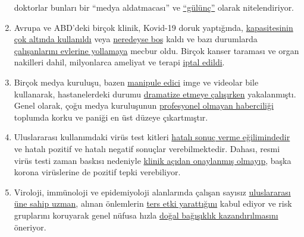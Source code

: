 \begin{enumerate}
  doktorlar bunları bir ``medya aldatmacası'' ve
  \href{https://www.aerztezeitung.de/Politik/Montgomery-haelt-Maskenpflicht-fuer-falsch-408844.html}{``gülünç''}
  olarak nitelendiriyor.
\item
  Avrupa ve ABD'deki birçok klinik, Kovid-19 doruk yaptığında,
  \href{https://www.hsj.co.uk/acute-care/nhs-hospitals-have-four-times-more-empty-beds-than-normal/7027392.article}{kapasitesinin
  çok altında kullanıldı} veya
  \href{https://www.sfchronicle.com/bayarea/article/Stanford-hospital-system-to-cut-pay-20-furlough-15227591.php}{neredeyse
  boş} kaldı ve bazı durumlarda
  \href{https://www.usatoday.com/story/news/health/2020/04/02/coronavirus-pandemic-jobs-us-health-care-workers-furloughed-laid-off/5102320002/}{çalışanlarını
  evlerine yollamaya} mecbur oldu. Birçok kanser taraması ve organ
  nakilleri dahil, milyonlarca ameliyat ve terapi
  \href{https://www.birmingham.ac.uk/news/latest/2020/05/covid-disruption-28-million-surgeries-cancelled.aspx}{iptal
  edildi}.
\item
  Birçok medya kuruluşu, bazen
  \href{https://www.wsj.com/articles/cbs-says-fake-news-wasnt-theirs-11588789238}{manipule
  edici} imge ve videolar bile kullanarak, hastanelerdeki durumu
  \href{https://nypost.com/2020/04/01/cbs-admits-to-using-footage-from-italy-in-report-about-nyc/}{dramatize
  etmeye çalışırken} yakalanmıştı. Genel olarak, çoğu medya kuruluşunun
  \href{https://onlinelibrary.wiley.com/doi/full/10.1111/eci.13222}{profesyonel
  olmayan haberciliği} toplumda korku ve paniği en üst düzeye
  çıkartmıştır.
\item
  Uluslararası kullanımdaki virüs test kitleri
  \href{https://www.ncbi.nlm.nih.gov/pubmed/32219885}{hatalı sonuç verme
  eğilimindedir} ve hatalı pozitif ve hatalı negatif sonuçlar
  verebilmektedir. Dahası, resmi virüs testi zaman baskısı nedeniyle
  \href{https://www.youtube.com/watch?v=p_AyuhbnPOI}{klinik açıdan
  onaylanmış olmayıp}, başka korona virüslerine de pozitif tepki
  verebiliyor.
\item
  Viroloji, immünoloji ve epidemiyoloji alanlarında çalışan sayısız
  \href{https://off-guardian.org/2020/03/24/12-experts-questioning-the-coronavirus-panic/}{uluslararası
  üne sahip uzman}, alınan önlemlerin
  \href{https://off-guardian.org/2020/03/28/10-more-experts-criticising-the-coronavirus-panic/}{ters
  etki yarattığını} kabul ediyor ve risk gruplarını koruyarak genel
  nüfusa hızla
  \href{https://off-guardian.org/2020/04/17/8-more-experts-questioning-the-coronavirus-panic/}{doğal
  bağışıklık kazandırılmasını} öneriyor.

\end{enumerate}
